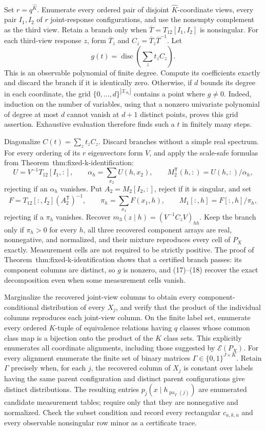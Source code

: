 Set \(r=q^{\widehat K}\).  Enumerate every ordered pair of disjoint \(\widehat K\)-coordinate views, every pair \(I_1,I_2\) of \(r\) joint-response configurations, and use the nonempty complement as the third view.  Retain a branch only when \(\overline T=T_{12}[I_1,I_2]\) is nonsingular.  For each third-view response \(z\), form \(\overline T_z\) and \(C_z=\overline T_z\overline T^{-1}\).  Let
\[
 g(t)=\operatorname{disc}\!\left(\sum_zt_zC_z\right).
\]
This is an observable polynomial of finite degree.  Compute its coefficients exactly and discard the branch if it is identically zero.  Otherwise, if \(d\) bounds its degree in each coordinate, the grid \(\{0,\ldots,d\}^{|\mathcal X_{S_3}|}\) contains a point where \(g\neq0\).  Indeed, induction on the number of variables, using that a nonzero univariate polynomial of degree at most \(d\) cannot vanish at \(d+1\) distinct points, proves this grid assertion.  Exhaustive evaluation therefore finds such a \(t\) in finitely many steps.

Diagonalize \(C(t)=\sum_zt_zC_z\).  Discard branches without a simple real spectrum.  For every ordering of its \(r\) eigenvectors form \(V\), and apply the scale-safe formulas from Theorem~\textnormal{thm:fixed-k-identification}:
\[
 U=V^{-1}T_{12}[I_1,:],
 \qquad
 \alpha_h=\sum_{x_2}U(h,x_2),
 \qquad
 M_2^{\mathsf T}(h,:)=U(h,:)/\alpha_h,
\tag{17}
\]
rejecting if an \(\alpha_h\) vanishes.  Put \(A_2=M_2[I_2,:]\), reject if it is singular, and set
\[
 F=T_{12}[:,I_2](A_2^{\mathsf T})^{-1},
 \qquad
 \pi_h=\sum_{x_1}F(x_1,h),
 \qquad
 M_1[:,h]=F[:,h]/\pi_h,
\tag{18}
\]
rejecting if a \(\pi_h\) vanishes.  Recover \(m_3(z\mid h)=(V^{-1}C_zV)_{hh}\).  Keep the branch only if \(\pi_h>0\) for every \(h\), all three recovered component arrays are real, nonnegative, and normalized, and their mixture reproduces every cell of \(P_X\) exactly.  Measurement cells are not required to be strictly positive.  The proof of Theorem~\textnormal{thm:fixed-k-identification} shows that a certified branch passes: its component columns are distinct, so \(g\) is nonzero, and (17)--(18) recover the exact decomposition even when some measurement cells vanish.

Marginalize the recovered joint-view columns to obtain every component-conditional distribution of every \(X_j\), and verify that the product of the individual columns reproduces each joint-view column.  On the finite label set, enumerate every ordered \(K\)-tuple of equivalence relations having \(q\) classes whose common class map is a bijection onto the product of the \(K\) class sets.  This explicitly enumerates all coordinate alignments, including those suggested by \(\mathcal E(P_X)\).  For every alignment enumerate the finite set of binary matrices \(\Gamma\in\{0,1\}^{J\times K}\).  Retain \(\Gamma\) precisely when, for each \(j\), the recovered column of \(X_j\) is constant over labels having the same parent configuration and distinct parent configurations give distinct distributions.  The resulting entries \(p_j(x\mid h_{\operatorname{pa}_\Gamma(j)})\) are enumerated candidate measurement tables; require only that they are nonnegative and normalized.  Check the subset condition and record every rectangular \(c_{a,k,u}\) and every observable nonsingular row minor as a certificate trace.

